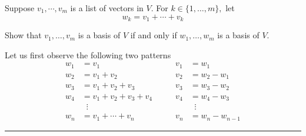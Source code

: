 \begin{xrcs}
  Suppose $v_1, \cdots, v_m$ is a list of vectors in $V$. For $k \in \{1, \ldots, m\},$ let
  \begin{equation}
    w_k = v_1 + \cdots + v_k
  \end{equation}

  Show that $v_1, \ldots, v_m$ is a basis of $V$ if and only if $w_1, \ldots, w_m$ is a basis of $V$.
\end{xrcs}
\begin{prf}
  Let us first observe the following two patterns
  \begin{equation}
    \begin{aligned}
      w_1 &= v_1                    & \qquad v_1 &= w_1       \\
      w_2 &= v_1 + v_2              & \qquad v_2 &= w_2 - w_1 \\
      w_3 &= v_1 + v_2 + v_3        & \qquad v_3 &= w_3 - w_2 \\
      w_4 &= v_1 + v_2 + v_3 + v_4  & \qquad v_4 &= w_4 - w_3 \\
      &\;\;\vdots               &            &\;\;\vdots \\
      w_n &= v_1 + \cdots + v_n     & \qquad v_n &= w_n - w_{n-1}
    \end{aligned}
  \end{equation}
\end{prf}

\phantom{.}

\hrule
